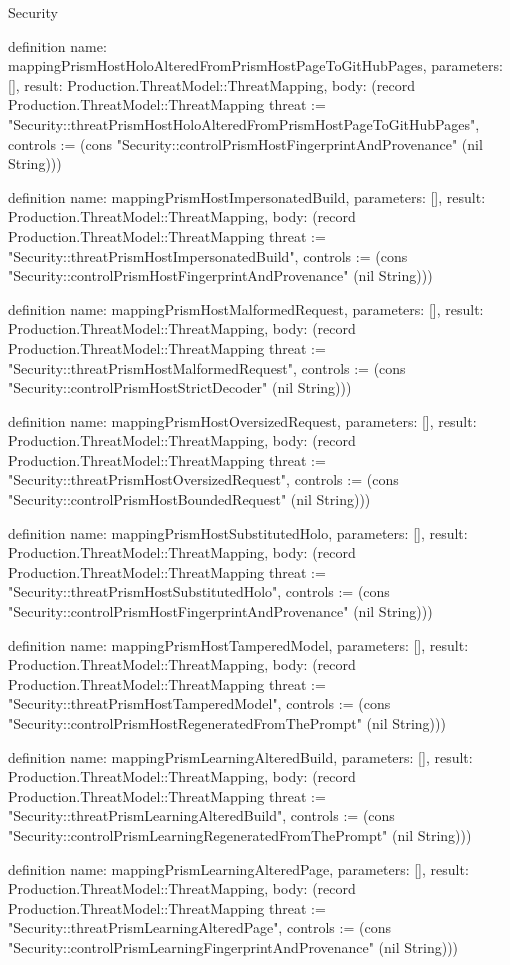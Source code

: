 \begin{lexlean}{Security}
\begin{semanticmodule}
definition{
  name: mappingPrismHostHoloAlteredFromPrismHostPageToGitHubPages,
  parameters: [],
  result: Production.ThreatModel::ThreatMapping,
  body: (record Production.ThreatModel::ThreatMapping {threat := "Security::threatPrismHostHoloAlteredFromPrismHostPageToGitHubPages", controls := (cons "Security::controlPrismHostFingerprintAndProvenance" (nil String))})
}

definition{
  name: mappingPrismHostImpersonatedBuild,
  parameters: [],
  result: Production.ThreatModel::ThreatMapping,
  body: (record Production.ThreatModel::ThreatMapping {threat := "Security::threatPrismHostImpersonatedBuild", controls := (cons "Security::controlPrismHostFingerprintAndProvenance" (nil String))})
}

definition{
  name: mappingPrismHostMalformedRequest,
  parameters: [],
  result: Production.ThreatModel::ThreatMapping,
  body: (record Production.ThreatModel::ThreatMapping {threat := "Security::threatPrismHostMalformedRequest", controls := (cons "Security::controlPrismHostStrictDecoder" (nil String))})
}

definition{
  name: mappingPrismHostOversizedRequest,
  parameters: [],
  result: Production.ThreatModel::ThreatMapping,
  body: (record Production.ThreatModel::ThreatMapping {threat := "Security::threatPrismHostOversizedRequest", controls := (cons "Security::controlPrismHostBoundedRequest" (nil String))})
}

definition{
  name: mappingPrismHostSubstitutedHolo,
  parameters: [],
  result: Production.ThreatModel::ThreatMapping,
  body: (record Production.ThreatModel::ThreatMapping {threat := "Security::threatPrismHostSubstitutedHolo", controls := (cons "Security::controlPrismHostFingerprintAndProvenance" (nil String))})
}

definition{
  name: mappingPrismHostTamperedModel,
  parameters: [],
  result: Production.ThreatModel::ThreatMapping,
  body: (record Production.ThreatModel::ThreatMapping {threat := "Security::threatPrismHostTamperedModel", controls := (cons "Security::controlPrismHostRegeneratedFromThePrompt" (nil String))})
}

definition{
  name: mappingPrismLearningAlteredBuild,
  parameters: [],
  result: Production.ThreatModel::ThreatMapping,
  body: (record Production.ThreatModel::ThreatMapping {threat := "Security::threatPrismLearningAlteredBuild", controls := (cons "Security::controlPrismLearningRegeneratedFromThePrompt" (nil String))})
}

definition{
  name: mappingPrismLearningAlteredPage,
  parameters: [],
  result: Production.ThreatModel::ThreatMapping,
  body: (record Production.ThreatModel::ThreatMapping {threat := "Security::threatPrismLearningAlteredPage", controls := (cons "Security::controlPrismLearningFingerprintAndProvenance" (nil String))})
}


\end{semanticmodule}
\end{lexlean}
